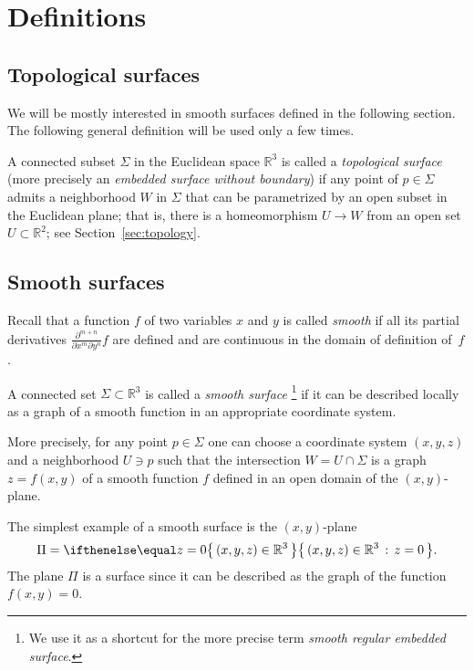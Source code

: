 \chapter{Definitions}
\label{chap:surfaces-def}
\section{Topological surfaces}

We will be mostly interested in smooth surfaces defined in the following section.
The following general definition will be used only a few times.

A connected subset $\Sigma$ in the Euclidean space $\mathbb{R}^3$
is called a \emph{topological surface} (more precisely an {}\emph{embedded surface without boundary}) 
if any point of $p\in \Sigma$ admits a neighborhood $W$ in $\Sigma$ 
that can be parametrized by an open subset in the Euclidean plane; 
that is, there is a homeomorphism $U\to W$ from an open set $U\subset \mathbb{R}^2$; see Section~\ref{sec:topology}.


\section{Smooth surfaces}\label{sec:def-smooth-surface}

Recall that a function $f$ of two variables $x$ and $y$ is called \emph{smooth} if all its partial derivatives $\frac{\partial^{m+n}}{\partial x^m\partial y^n}f$ are defined and are continuous in the domain of definition of~$f$. 

A connected set $\Sigma \subset \mathbb{R}^3$ is called a \emph{smooth surface}%
\footnote{We use it as a shortcut for the more precise term {}\emph{smooth regular embedded surface}.} if it can be described locally as a graph of a smooth function in an appropriate coordinate system.

More precisely, for any point $p\in \Sigma$ one can choose a coordinate system $(x,y,z)$ and a neighborhood $U\ni p$ such that
the intersection $W=U\cap \Sigma$ is a graph $z=f(x,y)$ of a smooth function $f$ defined in an open domain of the $(x,y)$-plane.

The simplest example of a smooth surface is the $(x,y)$-plane 
\[\Pi=\set{(x,y,z)\in\mathbb{R}^3}{z=0}.\]
The plane $\Pi$ is a surface since
it can be described as the graph of the function $f(x,y)=0$.

